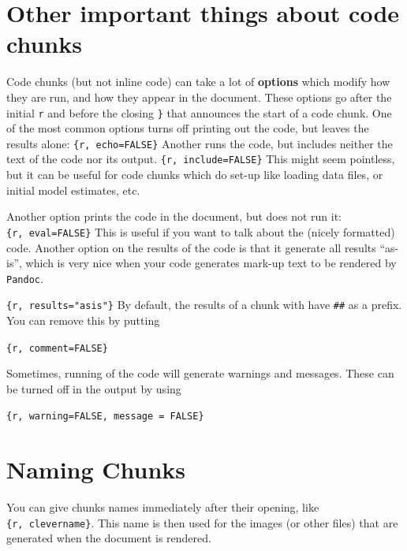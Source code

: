 \documentclass[]{book}
\theoremstyle{definition}
\theoremstyle{definition}
\theoremstyle{definition}
\theoremstyle{remark}
\begin{document}
\section{Other important things about code
chunks}\label{other-important-things-about-code-chunks}

Code chunks (but not inline code) can take a lot of \textbf{options}
which modify how they are run, and how they appear in the document.
These options go after the initial \texttt{r} and before the closing
\texttt{\}} that announces the start of a code chunk. One of the most
common options turns off printing out the code, but leaves the results
alone:
\texttt{\textasciigrave{}\textasciigrave{}\textasciigrave{}\{r,\ echo=FALSE\}}
Another runs the code, but includes neither the text of the code nor its
output.
\texttt{\textasciigrave{}\textasciigrave{}\textasciigrave{}\{r,\ include=FALSE\}}
This might seem pointless, but it can be useful for code chunks which do
set-up like loading data files, or initial model estimates, etc.

 Another option prints the code in the document, but does not run it:
\texttt{\textasciigrave{}\textasciigrave{}\textasciigrave{}\{r,\ eval=FALSE\}}
This is useful if you want to talk about the (nicely formatted) code.
Another option on the results of the code is that it generate all
results ``as-is'', which is very nice when your code generates mark-up
text to be rendered by \texttt{Pandoc}.

\texttt{\textasciigrave{}\textasciigrave{}\textasciigrave{}\{r,\ results="asis"\}}
By default, the results of a chunk with have \texttt{\#\#} as a prefix.
You can remove this by putting

\texttt{\textasciigrave{}\textasciigrave{}\textasciigrave{}\{r,\ comment=FALSE\}}

 Sometimes, running of the code will generate warnings and messages.
These can be turned off in the output by using

\texttt{\textasciigrave{}\textasciigrave{}\textasciigrave{}\{r,\ warning=FALSE,\ message\ =\ FALSE\}}

\section{Naming Chunks}\label{naming-chunks}

You can give chunks names immediately after their opening, like
\texttt{\textasciigrave{}\textasciigrave{}\textasciigrave{}\{r,\ clevername\}}.
This name is then used for the images (or other files) that are
generated when the document is rendered.
\end{document}
